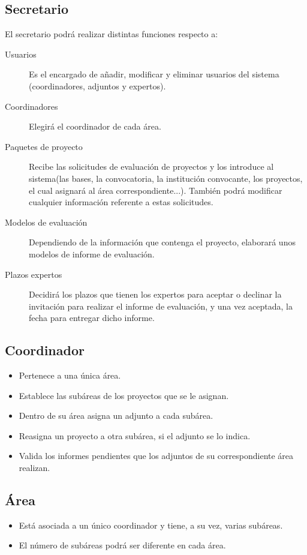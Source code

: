 \documentclass[12pt,a4paper,titlepage,spanish,twoside]{book}
\begin{document}
\subsection{Secretario}
El secretario podrá realizar distintas funciones respecto a:
\begin{description}
\item[Usuarios] Es el encargado de añadir, modificar y eliminar 
  usuarios del sistema (coordinadores, adjuntos y expertos).
\item[Coordinadores] Elegirá el coordinador de cada área.
\item[Paquetes de proyecto] Recibe las solicitudes de evaluación de proyectos
  y los introduce al sistema(las bases, la convocatoria, la institución
  convocante, los proyectos, el cual asignará al área correspondiente...). 
  También podrá modificar cualquier información referente a estas
  solicitudes. 
\item[Modelos de evaluación] Dependiendo de la información que contenga el
  proyecto, elaborará unos modelos de informe de evaluación. 
\item[Plazos expertos] Decidirá los plazos que tienen los expertos para
  aceptar o declinar la invitación para realizar el informe de evaluación,
  y una vez aceptada, la fecha para entregar dicho informe.
\end{description}

\subsection{Coordinador}
\begin{itemize}
\item Pertenece a una única área.
\item Establece las subáreas de los proyectos que se le asignan.
\item Dentro de su área asigna un adjunto a cada subárea.
\item Reasigna un proyecto a otra subárea, si el adjunto se lo indica.
\item Valida los informes pendientes que los adjuntos de su correspondiente 
  área realizan.
\end{itemize}

\subsection{Área}
\begin{itemize}
\item Está asociada a un único coordinador y tiene, a su vez, varias subáreas. 
\item El número de subáreas podrá ser diferente en cada área.
\end{itemize}
\end{document}

